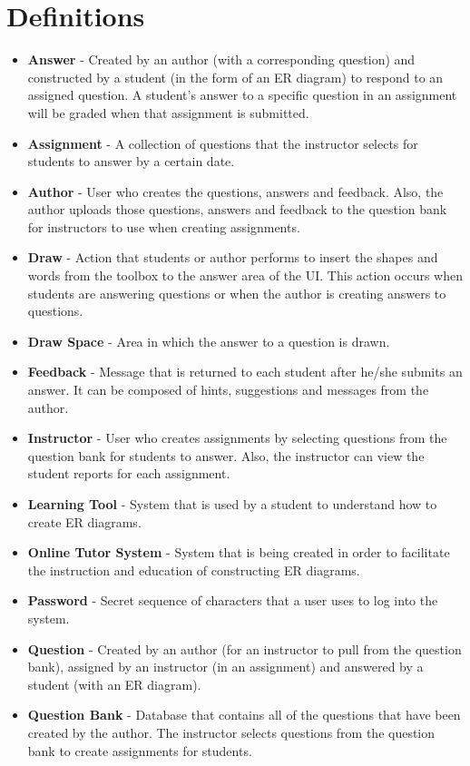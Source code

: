 \chapter{Definitions}
\begin{itemize}

\item \textbf{Answer} - Created by an author (with a corresponding question) and constructed by a student (in the form of an ER diagram) to respond to an assigned question. A student's answer to a specific question in an assignment will be graded when that assignment is submitted.
\item \textbf{Assignment} - A collection of questions that the instructor selects for students to answer by a certain date.
\item \textbf{Author} - User who creates the questions, answers and feedback. Also, the author uploads those questions, answers and feedback to the question bank for instructors to use when creating assignments.
\item \textbf{Draw} - Action that students or author performs to insert the shapes and words from the toolbox to the answer area of the UI. This action occurs when students are answering questions or when the author is creating answers to questions.
\item \textbf{Draw Space} - Area in which the answer to a question is drawn.
\item \textbf{Feedback} - Message that is returned to each student after he/she submits an answer. It can be composed of hints, suggestions and messages from the author.
\item \textbf{Instructor} - User who creates assignments by selecting questions from the question bank for students to answer. Also, the instructor can view the student reports for each assignment.
\item \textbf{Learning Tool} - System that is used by a student to understand how to create ER diagrams.
\item \textbf{Online Tutor System} - System that is being created in order to facilitate the instruction and education of constructing ER diagrams.
\item \textbf{Password} - Secret sequence of characters that a user uses to log into the system.
\item \textbf{Question} - Created by an author (for an instructor to pull from the question bank), assigned by an instructor (in an assignment) and answered by a student (with an ER diagram).
\item \textbf{Question Bank} - Database that contains all of the questions that have been created by the author. The instructor selects questions from the question bank to create assignments for students.


\end{itemize}
